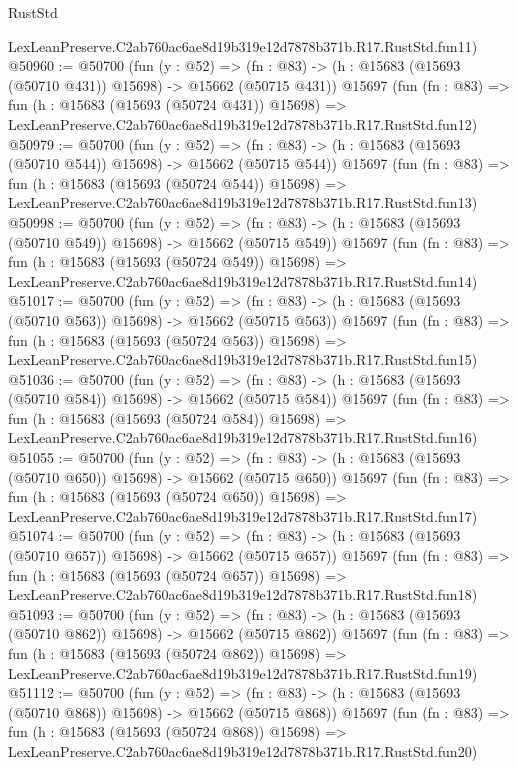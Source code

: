 \begin{lexlean}{RustStd}
\begin{coremodule}
    LexLeanPreserve.C2ab760ac6ae8d19b319e12d7878b371b.R17.RustStd.fun11)
@50960 := @50700
    (fun (y : @52) =>
    (fn : @83) -> (h : @15683 (@15693 (@50710 @431)) @15698) -> @15662 (@50715 @431))
    @15697
    (fun (fn : @83) =>
    fun (h : @15683 (@15693 (@50724 @431)) @15698) =>
    LexLeanPreserve.C2ab760ac6ae8d19b319e12d7878b371b.R17.RustStd.fun12)
@50979 := @50700
    (fun (y : @52) =>
    (fn : @83) -> (h : @15683 (@15693 (@50710 @544)) @15698) -> @15662 (@50715 @544))
    @15697
    (fun (fn : @83) =>
    fun (h : @15683 (@15693 (@50724 @544)) @15698) =>
    LexLeanPreserve.C2ab760ac6ae8d19b319e12d7878b371b.R17.RustStd.fun13)
@50998 := @50700
    (fun (y : @52) =>
    (fn : @83) -> (h : @15683 (@15693 (@50710 @549)) @15698) -> @15662 (@50715 @549))
    @15697
    (fun (fn : @83) =>
    fun (h : @15683 (@15693 (@50724 @549)) @15698) =>
    LexLeanPreserve.C2ab760ac6ae8d19b319e12d7878b371b.R17.RustStd.fun14)
@51017 := @50700
    (fun (y : @52) =>
    (fn : @83) -> (h : @15683 (@15693 (@50710 @563)) @15698) -> @15662 (@50715 @563))
    @15697
    (fun (fn : @83) =>
    fun (h : @15683 (@15693 (@50724 @563)) @15698) =>
    LexLeanPreserve.C2ab760ac6ae8d19b319e12d7878b371b.R17.RustStd.fun15)
@51036 := @50700
    (fun (y : @52) =>
    (fn : @83) -> (h : @15683 (@15693 (@50710 @584)) @15698) -> @15662 (@50715 @584))
    @15697
    (fun (fn : @83) =>
    fun (h : @15683 (@15693 (@50724 @584)) @15698) =>
    LexLeanPreserve.C2ab760ac6ae8d19b319e12d7878b371b.R17.RustStd.fun16)
@51055 := @50700
    (fun (y : @52) =>
    (fn : @83) -> (h : @15683 (@15693 (@50710 @650)) @15698) -> @15662 (@50715 @650))
    @15697
    (fun (fn : @83) =>
    fun (h : @15683 (@15693 (@50724 @650)) @15698) =>
    LexLeanPreserve.C2ab760ac6ae8d19b319e12d7878b371b.R17.RustStd.fun17)
@51074 := @50700
    (fun (y : @52) =>
    (fn : @83) -> (h : @15683 (@15693 (@50710 @657)) @15698) -> @15662 (@50715 @657))
    @15697
    (fun (fn : @83) =>
    fun (h : @15683 (@15693 (@50724 @657)) @15698) =>
    LexLeanPreserve.C2ab760ac6ae8d19b319e12d7878b371b.R17.RustStd.fun18)
@51093 := @50700
    (fun (y : @52) =>
    (fn : @83) -> (h : @15683 (@15693 (@50710 @862)) @15698) -> @15662 (@50715 @862))
    @15697
    (fun (fn : @83) =>
    fun (h : @15683 (@15693 (@50724 @862)) @15698) =>
    LexLeanPreserve.C2ab760ac6ae8d19b319e12d7878b371b.R17.RustStd.fun19)
@51112 := @50700
    (fun (y : @52) =>
    (fn : @83) -> (h : @15683 (@15693 (@50710 @868)) @15698) -> @15662 (@50715 @868))
    @15697
    (fun (fn : @83) =>
    fun (h : @15683 (@15693 (@50724 @868)) @15698) =>
    LexLeanPreserve.C2ab760ac6ae8d19b319e12d7878b371b.R17.RustStd.fun20)

\end{coremodule}
\end{lexlean}
